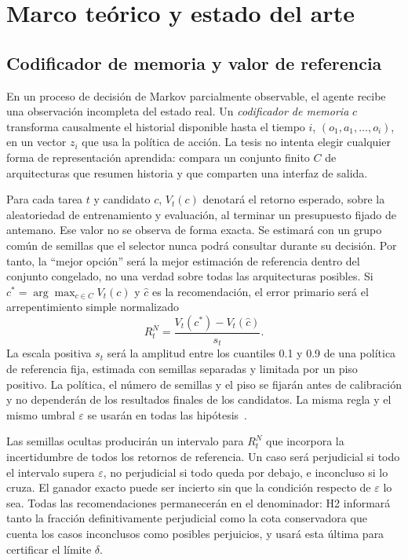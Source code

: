\documentclass[11pt,letterpaper]{article}
\newcommand{\Vt}{V_t}
\newcommand{\chat}{\hat c}
\newcommand{\cstar}{c^*}
\begin{document}
\section{Marco teórico y estado del arte}

\subsection{Codificador de memoria y valor de referencia}

En un proceso de decisión de Markov parcialmente observable, el agente recibe una observación incompleta del estado real.
Un \emph{codificador de memoria} $c$ transforma causalmente el historial disponible hasta el tiempo $i$,
$(o_1,a_1,\ldots,o_i)$, en un vector $z_i$ que usa la política de acción.
La tesis no intenta elegir cualquier forma de representación aprendida: compara un conjunto finito $C$ de arquitecturas que resumen historia y que comparten una interfaz de salida.

Para cada tarea $t$ y candidato $c$, $\Vt(c)$ denotará el retorno esperado, sobre la aleatoriedad de entrenamiento y evaluación, al terminar un presupuesto fijado de antemano.
Ese valor no se observa de forma exacta.
Se estimará con un grupo común de semillas que el selector nunca podrá consultar durante su decisión.
Por tanto, la \enquote{mejor opción} será la mejor estimación de referencia dentro del conjunto congelado, no una verdad sobre todas las arquitecturas posibles.
Si $\cstar=\arg\max_{c\in C}\Vt(c)$ y $\chat$ es la recomendación, el error primario será el arrepentimiento simple normalizado
\begin{equation}
  R_t^{N}=\frac{\Vt(\cstar)-\Vt(\chat)}{s_t}.
\end{equation}
La escala positiva $s_t$ será la amplitud entre los cuantiles 0.1 y 0.9 de una política de referencia fija, estimada con semillas separadas y limitada por un piso positivo.
La política, el número de semillas y el piso se fijarán antes de calibración y no dependerán de los resultados finales de los candidatos.
La misma regla y el mismo umbral $\varepsilon$ se usarán en todas las hipótesis~\cite{audibert2010bai,agarwal2021precipice}.

Las semillas ocultas producirán un intervalo para $R_t^{N}$ que incorpora la incertidumbre de todos los retornos de referencia.
Un caso será perjudicial si todo el intervalo supera $\varepsilon$, no perjudicial si todo queda por debajo, e inconcluso si lo cruza.
El ganador exacto puede ser incierto sin que la condición respecto de $\varepsilon$ lo sea.
Todas las recomendaciones permanecerán en el denominador: H2 informará tanto la fracción definitivamente perjudicial como la cota conservadora que cuenta los casos inconclusos como posibles perjuicios, y usará esta última para certificar el límite $\delta$.
\end{document}
